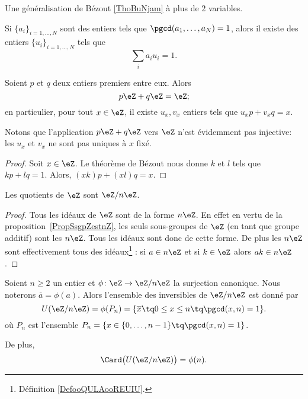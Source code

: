 Une généralisation de Bézout \ref{ThoBuNjam} à plus de \( 2\) variables.
\begin{proposition}     \label{PROPooWSMTooMdfqse}
	Si \( \{ a_i \}_{i=1,\ldots, N}\) sont des entiers tels que \( \pgcd(a_1,\ldots, a_N)=1\), alors il existe des entiers \( \{ u_i \}_{i=1,\ldots, N}\) tels que
	\begin{equation}
		\sum_ia_iu_i=1.
	\end{equation}
\end{proposition}

\begin{corollary}       \label{CorgEMtLj}
	Soient \( p\) et \( q\) deux entiers premiers entre eux. Alors
	\begin{equation}
		p\eZ+q\eZ=\eZ;
	\end{equation}
	en particulier, pour tout \( x \in \eZ \), il existe \( u_x, v_x \) entiers tels que \(u_x p + v_x q = x \).
\end{corollary}

Notons que l'application \( p\eZ+q\eZ\) vers \( \eZ\) n'est évidemment pas injective: les \( u_x\) et \( v_x\) ne sont pas uniques à \( x\) fixé.

\begin{proof}
	Soit \( x\in \eZ\). Le théorème de Bézout nous donne \( k\) et \( l\) tels que \( kp+lq=1\). Alors, \( (xk)p+(xl)q=x\).
\end{proof}


\begin{corollary}       \label{CORooLINXooBlUKPG}
	Les quotients de \( \eZ\) sont \( \eZ/n\eZ\).
\end{corollary}

\begin{proof}
	Tous les idéaux de \( \eZ\) sont de la forme \( n\eZ\). En effet en vertu de la proposition~\ref{PropSsgpZestnZ}, les seuls sous-groupes de \( \eZ\) (en tant que groupe additif) sont les \( n\eZ\). Tous les idéaux sont donc de cette forme. De plus les \( n\eZ\) sont effectivement tous des idéaux\footnote{Définition \ref{DefooQULAooREUIU}.} : si \( a\in n\eZ\) et si \( k\in \eZ\) alors \( ak\in n\eZ\).
\end{proof}

\begin{proposition}     \label{PropZpintssiprempUzn}
	Soient \( n\geq 2\) un entier et \( \phi\colon \eZ\to \eZ/n\eZ\) la surjection canonique. Nous noterons \( \overline a=\phi(a)\). Alors l'ensemble des inversibles de \( \eZ/n\eZ\) est donné par
	\begin{equation}
		U(\eZ/n\eZ)=\phi(P_n)=\{ \overline x\tq 0\leq x\leq n\tq\pgcd(x,n)=1 \}.
	\end{equation}
	où \( P_n\) est l'ensemble \( P_n=\{ x\in\{ 0,\ldots,n-1 \}\tq\pgcd(x,n)=1 \}\).

	De plus,
	\begin{equation}
		\Card\big( U(\eZ/n\eZ) \big)=\phi(n).
	\end{equation}
\end{proposition}

